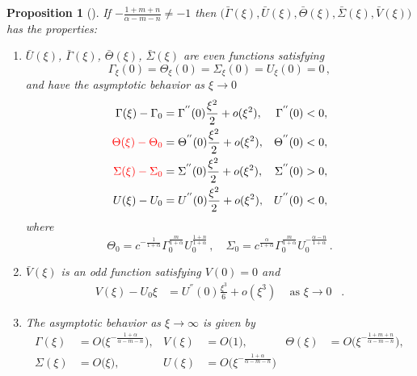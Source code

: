 \documentclass[a4paper,11pt]{article}
\def\red{\color{red}}
\def\bG{{\bar{\Gamma}}}
\def\bV{{\bar{V}}}
\def\bTh{{\bar{\Theta}}}
\def\bS{{\bar{\Sigma}}}
\def\bU{{\bar{U}}}
\def\BO{{{O}}}
\newtheorem{proposition}{Proposition}[section]
\theoremstyle{remark}
\begin{document}
\begin{proposition}[\cite{LKT17}] \label{mainthm2}
If $-\frac{1+m+n}{\alpha-m-n}\ne-1$ then
$\big(\bG(\xi), \bU(\xi), \bTh(\xi),\bS(\xi),\bV(\xi)\big)$ has the  properties:

 \begin{enumerate}
  \item[(i)] $\bU (\xi)$, $\bG(\xi)$, $\bTh(\xi)$, $\bS(\xi)$ are even functions satisfying
    \begin{equation*}
    \Gamma_\xi(0) = \Theta_\xi(0)=\Sigma_\xi(0) = {U}_\xi(0)=0 \, ,
  \end{equation*}
and have the asymptotic behavior as $\xi \rightarrow 0$
  \begin{equation} \label{eq:ss_asymp0}
  \begin{aligned}
    \Gamma(\xi) -\Gamma_0 &= \Gamma^{''}(0)\frac{\xi^2}{2} + o(\xi^2), & \Gamma^{''}(0)&<0,\\
    \red \Theta(\xi) - \Theta_0 &= \Theta^{''}(0)\frac{\xi^2}{2} + o(\xi^2), & \Theta^{''}(0)&<0,\\
    \red \Sigma(\xi) - \Sigma_0  &= \Sigma^{''}(0)\frac{\xi^2}{2} + o(\xi^2), & \Sigma^{''}(0)&>0, \\
    U(\xi) - U_0 &= U^{''}(0)\frac{\xi^2}{2} + o(\xi^2), & U^{''}(0)&<0,
   \end{aligned}
  \end{equation}
where
  $$
  \Theta_0  =  c^{-\frac{1}{1+\alpha}}\Gamma_0^{\frac{m}{1+\alpha}} U_0^{\frac{1+n}{1+\alpha}} \, , \quad
  \Sigma_0 = c^{\frac{\alpha}{1+\alpha}}\Gamma_0^{\frac{m}{1+\alpha}} U_0^{-\frac{\alpha-n}{1+\alpha}} \, .
  $$


\item[(ii)] $\bV(\xi)$ is an odd function satisfying ${V}(0) = 0$ and
 \begin{equation} \label{eq:ss_asymp1}
  \begin{aligned}
  V(\xi) - U_0\xi &= U^{''}(0)\frac{\xi^3}{6} + o(\xi^3)  \, \quad \mbox{as $\xi \to 0$ }\, .
  \end{aligned}
  \end{equation}


 \item[(iii)] The asymptotic behavior as $\xi \rightarrow \infty$ is given by
  \begin{equation} \label{eq:ss_asymp1}
  \begin{aligned}
    \Gamma(\xi) &= \BO\big(\xi^{-\frac{1+\alpha}{\alpha-m-n}}), & V(\xi) &= \BO\big(1), &    \Theta(\xi) &= \BO\big(\xi^{-\frac{1+m+n}{\alpha-m-n}}),\\
   \Sigma(\xi) &= \BO\big(\xi), &   U(\xi) &= \BO\big(\xi^{-\frac{1+\alpha}{\alpha-m-n}})
  \end{aligned}
  \end{equation}
 \end{enumerate}
\end{proposition}
\end{document}
